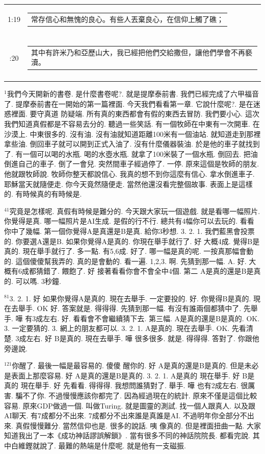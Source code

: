 \documentclass{book}
\begin{document}
\begin{longtable}{cl}
1:19 & \begin{tabularx}{0.7\textwidth}{X} 常存信心和無愧的良心。有些人丟棄良心，在信仰上觸了礁； \end{tabularx} \\ \\ \relax
1:20 & \begin{tabularx}{0.7\textwidth}{X} 其中有許米乃和亞歷山大，我已經把他們交給撒但，讓他們學會不再褻瀆。 \end{tabularx} \\ \\
[1ex]
\hline
\hline
\end{longtable}
$^{1}$我們今天開新的書卷.
是什麼書卷呢?.
就是提摩泰前書.
我們已經完成了六甲福音了.
提摩泰前書在一開始的第一篇裡面.
今天我們看看第一章.
它說什麼呢?.
是在迷惑裡面.
要守真道 防疑端.
所有真的東西都會有假的東西去冒防.
我們要小心.
這次我們知道真假都是不容易去分的.
聽過一些笑話.
有一個牧師在中東有一次開車.
在沙漠上.
中東很多的.
沒有油.
沒有油就知道距離100米有一個油站.
就知道走到那裡拿些油.
倒回車子就可以開到正式入油了.
沒有什麼儀器裝油.
於是他的車子就找到了.
有一個可以喝的水瓶.
喝的水壺水瓶.
就拿了100米裝了一個水瓶.
倒回去.
把油倒進自己的車子.
倒了一會兒.
突然間車子經過停了.
一停.
原來這個是牧師的朋友.
他就跟牧師說.
牧師你整天都說信心.
我真的想不到你這麼有信心.
拿水倒進車子.
耶穌當天就隨便走.
你今天竟然隨便走.
當然他還沒看完整個故事.
表面上是這樣的.
有時候真的有時候是.

$^{41}$究竟是怎樣呢.
真假有時候是難分的.
今天跟大家玩一個遊戲.
就是看哪一幅照片.
你覺得是真.
哪一幅照片是AI生成.
是假的行不行.
總共有4幅你可以去玩的.
看看你中了幾幅.
第一個你覺得A是真還是B是真.
給你3秒想.
3.
2.
1.
我們藍黑會投票的.
你要選A還是B.
如果你覺得A是真的.
你現在舉手就行了.
好 大概4成.
覺得B是真的.
現在舉手就行了.
多一點.
有5,6成.
好了.
哪一幅是真的呢.
一按真那幅會動的.
這個傻傻幫我弄的.
真的是會動的.
看一遍.
1,2,3.
啊.
先猜到那一幅.
A.
好.
大概有6成都猜錯了.
餵飽了.
好 接著看看你會不會全中4個.
第二 A是真的還是B是真的.
可以嗎.
3秒鐘.

$^{81}$3.
2.
1.
好 如果你覺得A是真的.
現在去舉手.
一定要投的.
好.
你覺得B是真的.
現在去舉手.
OK 好.
答案就是.
得得得.
先猜到那一幅.
有沒有誰兩個都猜中了.
先舉手.
嘩 有3成左右.
好.
看看會不會繼續猜下去.
第三幅.
A是真的還是B是真的.
OK.
3.
一定要猜的.
3.
網上的朋友都可以.
3.
2.
1.
A是真的.
現在去舉手.
OK.
先看清楚.
3成左右.
好 B是真的.
現在去舉手.
嘩 很多很多.
就是.
得得得.
答對了.
你跟他旁邊說.

$^{121}$你醒了.
最後一幅是最容易的.
傻傻 醒你的.
好 A是真的還是B是真的.
但是未必是表面上那麼容易.
好 A是真的還是B是真的.
3.
2.
1.
A是真的 現在舉手.
好 B是真的 現在舉手.
好 先看看.
得得得.
我想問誰猜對了.
舉手.
嘩 也有2成左右.
很厲害.
騙不了你.
不過慢慢應該你都完了.
因為經過現在的統計.
原來不僅是這個比較容易.
原來GDP做過一個.
叫做Turing.
就是圖靈的測試.
找一個人跟真人.
以及跟AI聊天.
有7成都分不出來.
7成都分不出來誰是真誰是AI.
不過明年你全部分不出來.
真假慢慢難分.
當然信仰也是.
很多的說話.
咦 像真的.
但是裡面扭曲一點.
大家知道我出了一本《成功神話謬誤解鎖》.
當有很多不同的神話院院長.
都看完說.
其中白維鏗就說了.
最難的熱端是什麼呢.
就是他有一支磁振.
\end{document}
